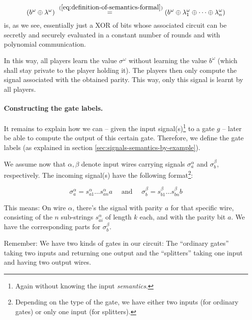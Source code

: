 \begin{equation}
\label{eq:computing-input-signals}
(b^\omega\oplus\lambda^\omega)\stackrel{~(\ref{eq:definition-of-semantics-formal})}{=}(b^\omega\oplus\lambda_{1}^\omega\oplus\dots\oplus\lambda_{n}^\omega)
\end{equation}
is, as we see, essentially just a XOR of bits whose associated circuit can be secretly and securely evaluated in a constant number of rounds and with polynomial communication.

In this way, all players learn the value $\sigma^\omega$ without learning the value $b^\omega$ (which shall stay private to the player holding it). The players then only compute the signal associated with the obtained parity. This way, only this signal is learnt by all players.

\paragraph{Constructing the gate labels.}

It remains to explain how we can -- given the input signal(s)\footnote{Again without knowing the input \emph{semantics}.} to a gate $g$ -- later be able to compute the output of this certain gate. Therefore, we define the gate labels (as explained in section \ref{sec:signals-semantics-by-example}). 

We assume now that $\alpha, \beta$ denote input wires carrying signals $\sigma^\alpha_a$ and $\sigma^\beta_b$, respectively. The incoming signal(s) have the following format\footnote{Depending on the type of the gate, we have either two inputs (for ordinary gates) or only one input (for splitters).}:

\begin{equation*}
  \sigma^\alpha_a=s_{a1}^\alpha\dots s_{an}^\alpha a  \quad \text{ and }\quad \sigma^\beta_b=s_{b1}^\beta\dots s_{bn}^\beta b
\end{equation*}

This means: On wire $\alpha$, there's the signal with parity $a$ for that specific wire, consisting of the $n$ sub-strings $s_{ai}^\alpha$ of length $k$ each, and with the parity bit $a$. We have the corresponding parts for $\sigma_b^\beta$.

Remember: We have two kinds of gates in our circuit: The ``ordinary gates'' taking two inputs and returning one output and the ``splitters'' taking one input and having two output wires.

